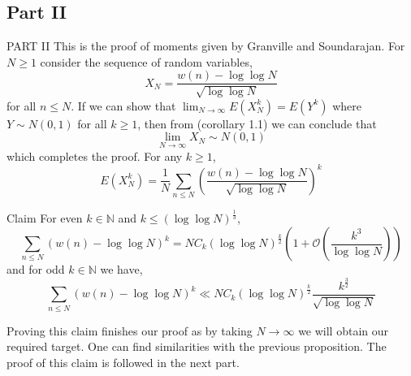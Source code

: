 \documentclass{beamer}
\numberwithin{theorem}{section}
\theoremstyle{definition}
\begin{document}
\subsection{Part II}
\begin{frame}{PART II}
This is the proof of moments given by Granville and Soundarajan.
For $N\ge 1$ consider the sequence of random variables,
$$X_N=\frac{w(n)-\log\log N}{\sqrt{\log\log N}}$$
    for all $n\le N$. If we can show that $\lim_{N\rightarrow\infty}E(X_N^k)=E(Y^k)$ where $Y\sim N(0,1)$ for all $k\ge 1$, then from (corollary 1.1) we can conclude that 
    $$\lim_{N\rightarrow\infty}X_N\sim N(0,1)$$ which completes the proof.
    For any $k\ge 1$,
    $$E(X_N^k)=\frac{1}{N}\sum_{n\le N}\left(\frac{w(n)-\log\log N}{\sqrt{\log\log N}}\right)^k$$
\end{frame}
\begin{frame}{}
    \begin{block}{Claim}
        For even $k\in \mathbb{N}$ and $k\le (\log\log N)^{\frac{1}{3}}$,
        $$\sum_{n\le N}(w(n)-\log \log N)^k=NC_k(\log\log N)^{\frac{k}{2}}\left(1+\mathcal{O}\left(\frac{k^3}{\log\log N}\right)\right)$$
        and for odd $k\in \mathbb{N}$ we have,
        $$\sum_{n\le N}(w(n)-\log \log N)^k \ll NC_k(\log\log N)^{\frac{k}{2}}\frac{k^{\frac{3}{2}}}{\sqrt{\log\log N}}$$
    \end{block}
    Proving this claim finishes our proof as by taking $N\rightarrow\infty$ we will obtain our required target. One can find similarities with the previous proposition. The proof of this claim is followed in the next part.
\end{frame}
\end{document}
